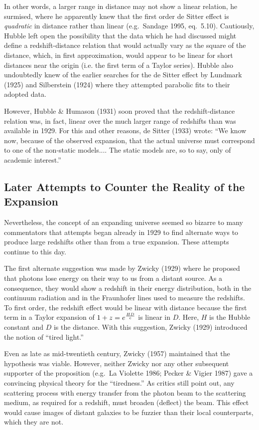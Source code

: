 \documentclass[preprint]{aastex}
\begin{document}
In other words, a larger range in distance may not show a linear
relation, he surmised, where he apparently knew that the first order
de Sitter effect is {\it quadratic} in distance rather than linear
(e.g.\ Sandage 1995, eq.\ 5.10). Cautiously, Hubble left open the
possibility that the data which he had discussed might define a
redshift-distance relation that would actually vary as the square of
the distance, which, in first approximation, would appear to be linear
for short distances near the origin (i.e. the first term of a Taylor
series). Hubble also undoubtedly knew of the earlier searches for the
de Sitter effect by Lundmark (1925) and Silberstein (1924) where they
attempted parabolic fits to their adopted data.

However, Hubble \& Humason (1931) soon proved that the
redshift-distance relation was, in fact, linear over the much larger
range of redshifts than was available in 1929. For this and other
reasons, de Sitter (1933) wrote: ``We know now, because of the
observed expansion, that the actual universe must correspond to one of
the non-static models.... The static models are, so to say, only of
academic interest.''
 
\subsection{Later Attempts to Counter the Reality of the Expansion} 
     
Nevertheless, the concept of an expanding universe seemed so bizarre
to many commentators that attempts began already in 1929 to find
alternate ways to produce large redshifts other than from a true
expansion. These attempts continue to this day.

The first alternate suggestion was made by Zwicky (1929) where he
proposed that photons lose energy on their way to us from a distant
source. As a consequence, they would show a redshift in their energy
distribution, both in the continuum radiation and in the Fraunhofer
lines used to measure the redshifts. To first order, the redshift
effect would be linear with distance because the first term in a
Taylor expansion of $1 + z = e^{{HD}\over{c}}$ is linear in $D$. Here,
$H$ is the Hubble constant and $D$ is the distance. With this
suggestion, Zwicky (1929) introduced the notion of ``tired light.''

Even as late as mid-twentieth century, Zwicky (1957) maintained that
the hypothesis was viable. However, neither Zwicky nor any other
subsequent supporter of the proposition (e.g.\ La Violette 1986;
Pecker \& Vigier 1987) gave a convincing physical theory for the
``tiredness.'' As critics still point out, any scattering process with
energy transfer from the photon beam to the scattering medium, as
required for a redshift, must broaden (deflect) the beam. This effect
would cause images of distant galaxies to be fuzzier than their local
counterparts, which they are not.
\end{document}
